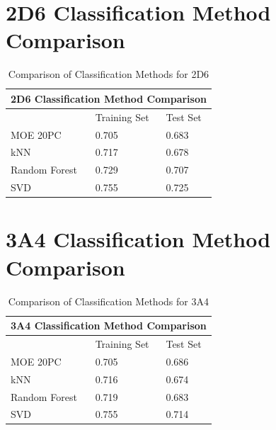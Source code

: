 \section{2D6 Classification Method Comparison}

\begin{table}[!htbp]
\begin{tabular}{|l|l|l|}
\hline
\multicolumn{3}{|c|}{2D6 Classification Method Comparison} \\ \hline
          & Training Set & Test Set \\ \hline
MOE 20PC  & 0.705        & 0.683    \\ \hline
kNN       & 0.717        & 0.678    \\ \hline
Random Forest & 0.729    & 0.707    \\ \hline
SVD       & 0.755        & 0.725    \\ \hline
\end{tabular}
\caption{Comparison of Classification Methods for 2D6}
\end{table}

\section{3A4 Classification Method Comparison}

\begin{table}[!htbp]
\begin{tabular}{|l|l|l|}
\hline
\multicolumn{3}{|c|}{3A4 Classification Method Comparison} \\ \hline
          & Training Set & Test Set \\ \hline
MOE 20PC  & 0.705        & 0.686    \\ \hline
kNN       & 0.716        & 0.674    \\ \hline
Random Forest & 0.719    & 0.683    \\ \hline
SVD       & 0.755        & 0.714    \\ \hline
\end{tabular}
\caption{Comparison of Classification Methods for 3A4}
\end{table}


